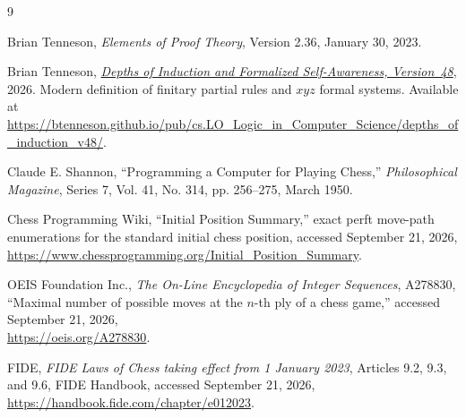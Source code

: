 \documentclass[11pt]{article}
\theoremstyle{definition}
\theoremstyle{remark}
\begin{document}
\begin{thebibliography}{9}

Brian Tenneson,
\emph{Elements of Proof Theory}, Version 2.36, January 30, 2023.

Brian Tenneson,
\href{https://btenneson.github.io/pub/cs.LO_Logic_in_Computer_Science/depths_of_induction_v48/}{\emph{Depths of Induction and Formalized Self-Awareness, \mbox{Version~48}}}, 2026. Modern definition of finitary partial rules and $xyz$ formal systems. Available at \url{https://btenneson.github.io/pub/cs.LO_Logic_in_Computer_Science/depths_of_induction_v48/}.

Claude E. Shannon,
``Programming a Computer for Playing Chess,''
\emph{Philosophical Magazine}, Series 7, Vol. 41, No. 314, pp. 256--275, March 1950.

Chess Programming Wiki,
``Initial Position Summary,'' exact perft move-path enumerations for the standard initial chess position,
accessed September 21, 2026,\\
\url{https://www.chessprogramming.org/Initial_Position_Summary}.

OEIS Foundation Inc.,
\emph{The On-Line Encyclopedia of Integer Sequences}, A278830,
``Maximal number of possible moves at the $n$-th ply of a chess game,''
accessed September 21, 2026,\\
\url{https://oeis.org/A278830}.

FIDE,
\emph{FIDE Laws of Chess taking effect from 1 January 2023}, Articles 9.2, 9.3, and 9.6,
FIDE Handbook, accessed September 21, 2026,\\
\url{https://handbook.fide.com/chapter/e012023}.

\end{thebibliography}
\end{document}
